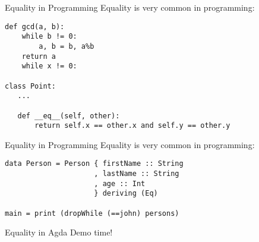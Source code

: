\begin{frame}[fragile]{Equality in Programming}
  Equality is very common in programming:

\begin{lstlisting}
def gcd(a, b):
    while b != 0:
        a, b = b, a%b
    return a
    while x != 0:

class Point:
   ...

   def __eq__(self, other):
       return self.x == other.x and self.y == other.y
\end{lstlisting}
\end{frame}

\begin{frame}[fragile]{Equality in Programming}
  Equality is very common in programming:

\begin{lstlisting}
data Person = Person { firstName :: String
                     , lastName :: String
                     , age :: Int
                     } deriving (Eq)

main = print (dropWhile (==john) persons)
\end{lstlisting}
\end{frame}

\begin{frame}{Equality in Agda}
  Demo time!
\end{frame}

